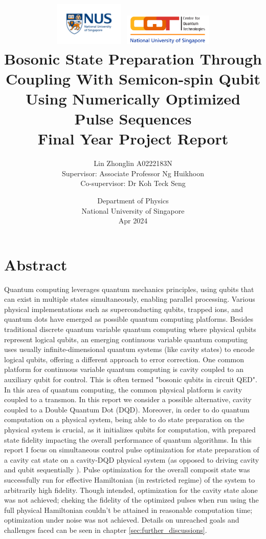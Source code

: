 \documentclass[12pt]{report}
\title{
\includegraphics[width=0.25\textwidth]{nus_logo.jpeg}
\includegraphics[width=0.32\textwidth]{cqt_logo.png}\\
{\LARGE \textbf{
    Bosonic State Preparation Through Coupling With Semicon-spin Qubit Using Numerically Optimized Pulse Sequences
    }}\\
\vspace{5mm}
{Final Year Project Report}
}
\author{
    {\normalsize Lin Zhonglin \hspace{10mm} A0222183N}\\
    \vspace{1mm}
    {\normalsize Supervisor: Associate Professor Ng Huikhoon}\\
    {\normalsize Co-supervisor: Dr Koh Teck Seng}
}
\date{
    {\normalsize Department of Physics}\\
    {\normalsize National University of Singapore}\\
    {\normalsize Apr 2024}
}
\begin{document}
\justifying
\linespread{1.2}
\setlength{\parskip}{1em}
\setlength{\parindent}{0pt}

\maketitle


\chapter*{Abstract}
Quantum computing leverages quantum mechanics principles, using qubits that can exist in multiple states simultaneously, enabling parallel processing. 
Various physical implementations such as superconducting qubits, trapped ions, and quantum dots have emerged as possible quantum computing platforms.
Besides traditional discrete quantum variable quantum computing where physical qubits represent logical qubits, an emerging continuous variable quantum computing uses usually infinite-dimensional quantum systems (like cavity states) to encode logical qubits, offering a different approach to error correction. \cite{RevModPhys.77.513}
One common platform for continuous variable quantum computing is cavity coupled to an auxiliary qubit for control.
This is often termed "bosonic qubits in circuit QED".\cite{Joshi_2021} In this area of quantum computing, the common physical platform is cavity coupled to a transmon. In this report we consider a possible alternative, cavity coupled to a Double Quantum Dot (DQD). \cite{D_Anjou_2019}
Moreover, in order to do quantum computation on a physical system, being able to do state preparation on the physical system is crucial, as it initializes qubits for computation, with prepared state fidelity impacting the overall performance of quantum algorithms. \cite{Nielsen2010}
In this report I focus on simultaneous control pulse optimization for state preparation of a cavity cat state on a cavity-DQD physical system (as opposed to driving cavity and qubit sequentially ). 
Pulse optimization for the overall composit state was successfully run for effective Hamiltonian (in restricted regime) of the system to arbitrarily high fidelity.
Though intended, optimization for the cavity state alone was not achieved; 
cheking the fidelity of the optimized pulses when run using the full physical Hamiltonian couldn't be attained in reasonable computation time;
optimization under noise was not achieved.  
Details on unreached goals and challenges faced can be seen in chapter \ref{sec:further_discussions}.
\end{document}
